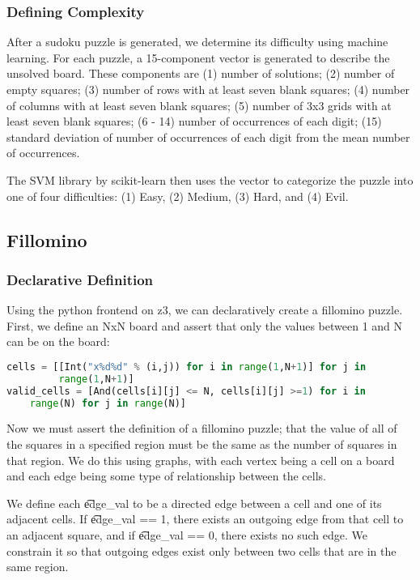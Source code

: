 \subsubsection{Defining Complexity}
After a sudoku puzzle is generated, we determine its difficulty using
machine learning. For each puzzle, a 15-component vector is generated to describe the unsolved board. These components are (1) number of solutions; (2) number of empty squares; (3) number of rows with at least seven blank squares; (4) number of columns with at least seven blank squares; (5) number of 3x3 grids with at least seven blank squares; (6 - 14) number of occurrences of each digit; (15) standard deviation of number of occurrences of each digit from the mean number of occurrences.

The SVM library by scikit-learn then uses the vector to categorize the
puzzle into one of four difficulties: (1) Easy, (2) Medium, (3) Hard,
and (4) Evil.

\subsection{Fillomino}

\subsubsection{Declarative Definition}
Using the python frontend on z3, we can declaratively create a fillomino puzzle.
First, we define an NxN board and assert that only the values between
1 and N can be on the board: 

\singlespace
\begin{lstlisting}[language=python, frame=single]
cells = [[Int("x%d%d" % (i,j)) for i in range(1,N+1)] for j in
         range(1,N+1)]
valid_cells = [And(cells[i][j] <= N, cells[i][j] >=1) for i in
	range(N) for j in range(N)]
\end{lstlisting}
\doublespace

Now we must assert the definition of a fillomino puzzle; that the
value of all of the squares in a specified region must be the same as
the number of squares in that region. We do this using graphs, with
each vertex being a cell on a board and each edge being some type of relationship between the cells.

We define each \t{edge\_val} to be a directed edge between a cell and one of its adjacent cells. If \t{edge\_val == 1}, there exists an outgoing edge from that cell to an adjacent square, and if \t{edge\_val == 0}, there exists no such edge. We constrain it so that outgoing edges exist only between two cells that are in the same region. 

